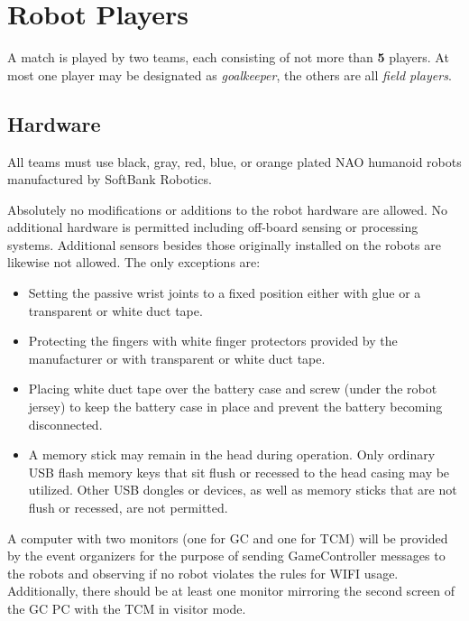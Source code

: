 \section{Robot Players}
\label{sec:robot_players}
A match is played by two teams, each consisting of not more than \textbf{5} players. At most one player may be designated as \emph{goalkeeper}, the others are all \emph{field players}.

\subsection{Hardware}
\label{sec:hardware}
All teams must use black, gray, red, blue, or orange plated NAO humanoid robots manufactured by SoftBank Robotics.

Absolutely no modifications or additions to the robot hardware are allowed. No additional hardware is permitted including off-board sensing or processing systems. Additional sensors besides those originally installed on the robots are likewise not allowed. The only exceptions are:

\begin{itemize}
    \item Setting the passive wrist joints to a fixed position either with glue or a transparent or white duct tape.
    \item Protecting the fingers with white finger protectors provided by the manufacturer or with transparent or white duct tape.
    \item Placing white duct tape over the battery case and screw (under the robot jersey) to keep the battery case in place and prevent the battery becoming disconnected.
    \item A memory stick may remain in the head during operation.  Only ordinary USB flash memory keys that sit flush or recessed to the head casing may be utilized. Other USB dongles or devices, as well as memory sticks that are not flush or recessed, are not permitted.
\end{itemize}

A computer with two monitors (one for GC and one for TCM) will be provided by the event organizers for the purpose of sending GameController messages to the robots and observing if no robot violates the rules for WIFI usage.
Additionally, there should be at least one monitor mirroring the second screen of the GC PC with the TCM in visitor mode. 

